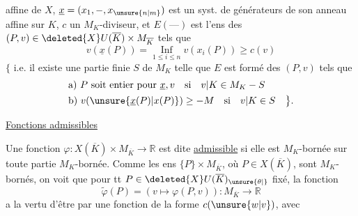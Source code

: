 affine de $X$, $\underline{x}=(x_1,-,x_{\unsure{n|m}})$ est un syst. de générateurs de son anneau affine sur $K$, $c$ un $M_K$-diviseur, et $E(\text{---})$ est l'ens des $(P,v)\in\deleted{X}U(\overline K)\times M_{\overline K}$ tels que
\[
v(\underline{x}(P))=\mathop{\mathrm{Inf}}\limits_{1\leq i\leq n} v(x_i(P))\geq c(v)
\]
$\bigl\{$ i.e.  il existe une partie finie $S$ de $M_K$ telle que $E$ est formé des $(P,v)$  tels que
\[
\begin{aligned}
&\text{a) }P\text{ soit entier pour }\underline{x},v\quad\text{si}\quad v|K\in M_K-S\\
&\text{b) }v(\unsure{\underline{x}(P)|x(P)})\geq-M\quad\text{si}\quad v|K\in S\quad\bigl\}.
\end{aligned}
\]


\uline{Fonctions admissibles}

Une fonction $\varphi:X(\overline K)\times M_{\overline K}\longrightarrow\mathbb R$ est dite \uline{admissible} si elle est  $M_K$-bornée sur toute partie $M_K$-bornée. Comme les ens $\{P\}\times M_{\overline K}$, où $P\in X(\overline K)$, sont $M_K$-bornés, on voit que  pour tt $P\in\deleted{X}U(\overline K)_{\unsure{\theta|{}}}$ fixé, la fonction
\[
\widetilde{\varphi}(P)=(v\mapsto\varphi(P,v)):M_{\overline K}\longrightarrow\mathbb R
\]
a la vertu d'être   par une fonction de la forme $c(\unsure{w|v})$, avec
